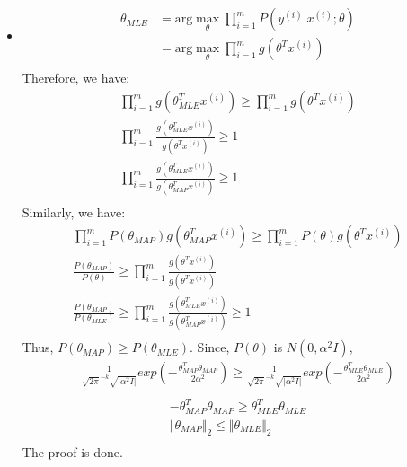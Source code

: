 \documentclass[pdftex,11pt]{article}
\begin{document}
\subsection{}
\begin{itemize}
\item \begin{align*}
		\theta_{MLE} &= \text{arg}\max_{\theta}\prod_{i=1}^{m}P(y^{(i)}| x^{(i)}; \theta) \\
		&=  \text{arg}\max_{\theta}\prod_{i=1}^{m}g(\theta^T x^{(i)}) \\
	\end{align*}
	Therefore, we have:
	\begin{align*} 
		\prod_{i=1}^{m}{g(\theta_{MLE}^T x^{(i)})} \geq \prod_{i=1}^{m}{g(\theta^T x^{(i)})}\\
		\prod_{i=1}^{m}\frac {g(\theta_{MLE}^T x^{(i)})}{g(\theta^T x^{(i)})} \geq 1\\
		\prod_{i=1}^{m}\frac {g(\theta_{MLE}^T x^{(i)})}{g(\theta_{MAP}^T x^{(i)})} \geq 1\\
	\end{align*}
	Similarly, we have:
	\begin{align*} 
		\prod_{i=1}^{m}{P(\theta_{MAP})g(\theta_{MAP}^T x^{(i)})} \geq \prod_{i=1}^{m}{P(\theta)g(\theta^T x^{(i)})}\\
		\frac {P(\theta_{MAP})}{P(\theta)} \geq \prod_{i=1}^{m}\frac {g(\theta^T x^{(i)})}{g(\theta^T x^{(i)})}\\
		\frac {P(\theta_{MAP})}{P(\theta_{MLE})} \geq \prod_{i=1}^{m}\frac {g(\theta_{MLE}^T x^{(i)})}{g(\theta_{MAP}^T x^{(i)})} \geq 1 \\
	\end{align*}
	Thus, $P(\theta_{MAP}) \geq P(\theta_{MLE})$. Since, $P(\theta)$ is $N(0, \alpha^2I)$,
	\begin{align*} 
		\frac {1}{\sqrt{2\pi}^{-k}\sqrt{|\alpha^2 I|} } exp ( - \frac{\theta_{MAP}^T\theta_{MAP}}{2\alpha^2}) \geq \frac{1}{\sqrt{2\pi}^{-k}\sqrt{|\alpha^2 I|} } exp ( - \frac{\theta_{MLE}^T\theta_{MLE}}{2\alpha^2}) \\
	\end{align*}
	\begin{align*} 
		- \theta_{MAP}^T\theta_{MAP}  \geq \theta_{MLE}^T\theta_{MLE}\\
		\Vert\theta_{MAP}\Vert_2 \leq \Vert\theta_{MLE}\Vert_2 \\
	\end{align*}
	The proof is done.
\end{itemize}
\end{document}
